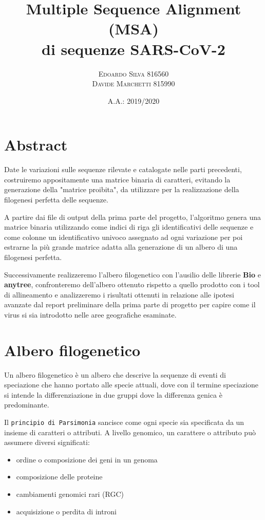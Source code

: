 \documentclass[11pt,italian]{article}
\title{Multiple Sequence Alignment (MSA) \\ di sequenze SARS-CoV-2}
\date{A.A.: 2019/2020}
\author{
    \textsc{Edoardo Silva} 816560 \\
    \textsc{Davide Marchetti} 815990
}
\begin{document}
\maketitle

\section{Abstract}
Date le variazioni sulle sequenze rilevate e catalogate nelle parti precedenti, costruiremo appositamente una matrice binaria di caratteri, evitando la generazione della "matrice proibita", da utilizzare per la realizzazione della filogenesi perfetta delle sequenze.

\vspace{1mm}
A partire dai file di output della prima parte del progetto, l'algoritmo genera una matrice binaria utilizzando come indici di riga gli identificativi delle sequenze e come colonne un identificativo univoco assegnato ad ogni variazione per poi estrarne la più grande matrice adatta alla generazione di un albero di una filogenesi perfetta.

\vspace{1mm}
Successivamente realizzeremo l'albero filogenetico con l'ausilio delle librerie \textbf{Bio} e \textbf{anytree}, confronteremo dell'albero ottenuto rispetto a quello prodotto con i tool di allineamento e analizzeremo i risultati ottenuti in relazione alle ipotesi avanzate dal report preliminare della prima parte di progetto per capire come il virus si sia introdotto nelle aree geografiche esaminate.

\newpage

\section{Albero filogenetico}
Un albero filogenetico è un albero che descrive la sequenze di eventi di speciazione che hanno portato alle specie attuali, dove con il termine speciazione si intende la differenziazione in due gruppi dove la differenza genica è predominante.

Il \lstinline{principio di Parsimonia} sancisce come ogni specie sia specificata da un insieme di caratteri o attributi.
A livello genomico, un carattere o attributo può assumere diversi significati:
\begin{itemize}
  \item ordine o composizione dei geni in un genoma
  \item composizione delle proteine
  \item cambiamenti genomici rari (RGC)
  \item acquisizione o perdita di introni
\end{itemize}
\end{document}
